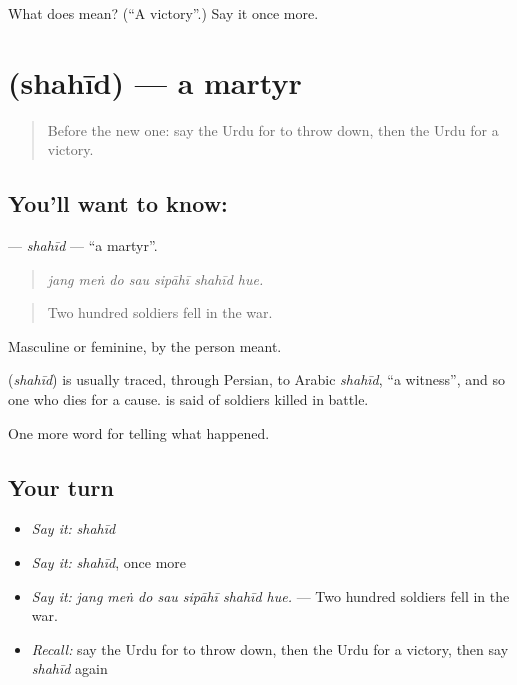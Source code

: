 \begin{tcolorbox}[breakable,colback=teal!4,colframe=teal!35!black,title={Before you move on}]
What does  mean? (\textquotedblleft{}A victory\textquotedblright{}.) Say it once more.
\end{tcolorbox}
\section[\texorpdfstring{\ur{شہید} (shahīd)}{شہید (shahīd)}]{ (shahīd) — a martyr}

\label{lesson:UR-C311-shahid}



\begin{quote}
Before the new one: say the Urdu for to throw down, then the Urdu for a victory.
\end{quote}

\subsection*{You'll want to know: }
\textbf{} — \emph{shahīd} — \textquotedblleft{}a martyr\textquotedblright{}.

\begin{quote}
      
\end{quote}

\begin{quote}
\emph{jang meṅ do sau sipāhī shahīd hue.}
\end{quote}

\begin{quote}
Two hundred soldiers fell in the war.
\end{quote}

Masculine or feminine, by the person meant.

\begin{cousinweb}
\textbf{} (\emph{shahīd}) is usually traced, through Persian, to Arabic \emph{shahīd}, \textquotedblleft{}a witness\textquotedblright{}, and so one who dies for a cause. \textbf{ } is said of soldiers killed in battle.
\end{cousinweb}

\begin{grammarlens}[title={What you've built}]
One more word for telling what happened.
\end{grammarlens}

\subsection*{Your turn}
\begin{itemize}
\raggedright
  \item \emph{Say it:} \emph{shahīd}
  \item \emph{Say it:} \emph{shahīd}, once more
  \item \emph{Say it:} \emph{jang meṅ do sau sipāhī shahīd hue.} — Two hundred soldiers fell in the war.
  \item \emph{Recall:} say the Urdu for to throw down, then the Urdu for a victory, then say \emph{shahīd} again
\end{itemize}

